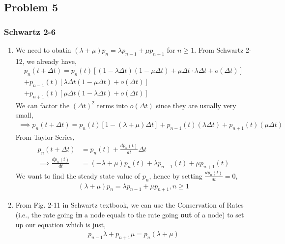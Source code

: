 \documentclass{article}
\begin{document}
	\subsection*{Problem 5}
		\subsubsection*{Schwartz 2-6}
			\begin{enumerate}
				\item We need to obatin $(\lambda + \mu) p_{n} = \lambda p_{n-1} + \mu p_{n+1}$
					for $n \geqslant 1$. From Schwartz 2-12, we already have,
					\begin{gather*}
						p_{n}(t + \Delta t) = p_{n}(t) [ (1 - \lambda \Delta t)(1 - \mu \Delta t) + \mu \Delta t \cdot \lambda \Delta t + o(\Delta t) ] \\
						+ p_{n-1}(t) [ \lambda \Delta t (1 - \mu \Delta t) + o(\Delta t) ] \\
						+ p_{n+1}(t) [ \mu \Delta t (1 - \lambda \Delta t) + o(\Delta t) ]
					\end{gather*}
					We can factor the $(\Delta t)^{2}$ terms into $o(\Delta t)$ since they
					are usually very small,
					\begin{gather*}
						\implies p_{n}(t + \Delta t) = p_{n}(t) [1 - (\lambda + \mu) \Delta t] + p_{n-1}(t) (\lambda \Delta t) + p_{n+1}(t) (\mu \Delta t)
					\end{gather*}
					From Taylor Series,
					\begin{align*}
						p_{n}(t + \Delta t) &= p_{n}(t) + \frac{dp_{n}(t)}{dt} \Delta t \\
						\implies \frac{dp_{n}(t)}{dt} &= (-\lambda + \mu) p_{n}(t) + \lambda p_{n-1}(t) + \mu p_{n+1}(t)
					\end{align*}
					We want to find the steady state value of $p_{n}$, hence by setting $\frac{dp_{n}(t)}{dt} = 0$,
					\begin{align*}
						(\lambda + \mu) p_{n} = \lambda p_{n-1} + \mu p_{n+1}, n \geqslant 1
					\end{align*}
				\item From Fig. 2-11 in Schwartz textbook, we can use the Conservation
					of Rates (i.e., the rate going \textbf{in} a node equals to the rate
					going \textbf{out} of a node) to set up our equation which is just,
					\begin{align*}
						p_{n-1}\lambda + p_{n+1}\mu = p_{n}(\lambda + \mu)
					\end{align*}
			\end{enumerate}
\end{document}
